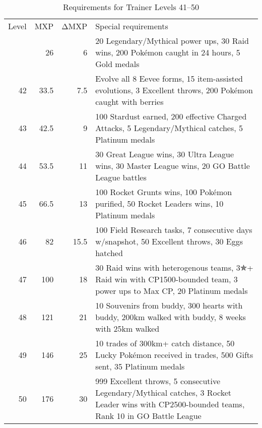 \begin{table}[ht]
\begin{center}
  \begin{tabular}{r r r p{}}
Level & MXP & ΔMXP & Special requirements \\
\Midrule
41 & 26 & 6 & 20 Legendary/Mythical power ups,
                      30 Raid wins,
                      200 Pokémon caught in 24 hours,
                      5 Gold medals\\
42 & 33.5 & 7.5 & Evolve all 8 Eevee forms,
                      15 item-assisted evolutions,
                      3 Excellent throws,
                      200 Pokémon caught with berries \\
43 & 42.5 & 9 & 100 Stardust earned,
                      200 effective Charged Attacks,
                      5 Legendary/Mythical catches,
                      5 Platinum medals \\
44 & 53.5 & 11 & 30 Great League wins,
                       30 Ultra League wins,
                       30 Master League wins,
                       20 GO Battle League battles \\
45 & 66.5 & 13 & 100 Rocket Grunts wins,
                       100 Pokémon purified,
                       50 Rocket Leaders wins,
                       10 Platinum medals\\
46 & 82 & 15.5 & 100 Field Research tasks,
                       7 consecutive days w/snapshot,
                       50 Excellent throws,
                       30 Eggs hatched\\
47 & 100 & 18 & 30 Raid wins with heterogenous teams,
                        3{\symbolfont ✯}+ Raid win with CP1500-bounded team,
                        3 power ups to Max CP,
                        20 Platinum medals\\
48 & 121 & 21 & 10 Souvenirs from buddy,
                        300 hearts with buddy,
                        200km walked with buddy,
                        8 weeks with 25km walked\\
49 & 146 & 25 & 10 trades of 300km+ catch distance,
                        50 Lucky Pokémon received in trades,
                        500 Gifts sent,
                        35 Platinum medals\\
50 & 176 & 30 & 999 Excellent throws,
                        5 consecutive Legendary/Mythical catches,
                        3 Rocket Leader wins with CP2500-bounded teams,
                        Rank 10 in GO Battle League\\
\end{tabular}
\caption{Requirements for Trainer Levels 41--50}
\label{table:xp41plus}
\end{center}
\end{table}


